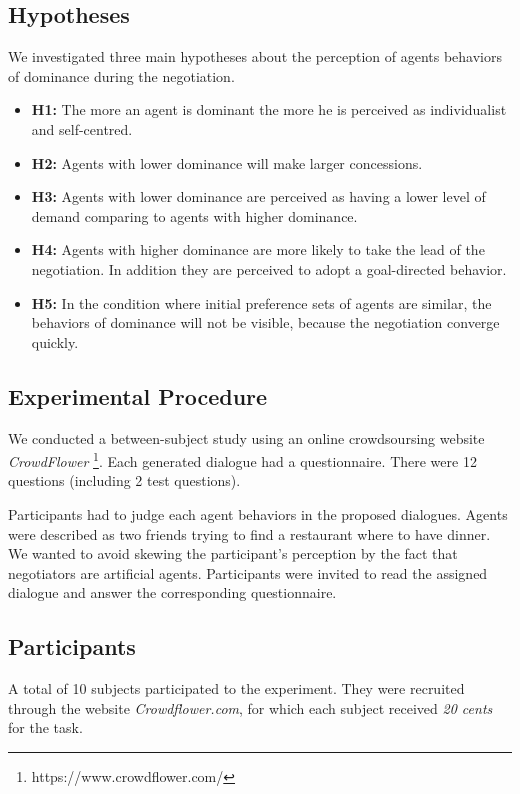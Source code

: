 \documentclass{llncs}
\begin{document}
	\subsection{Hypotheses}
	 We investigated three main hypotheses about the perception of agents behaviors of dominance during the negotiation. 
	 \begin{itemize}
	 	\item  \textbf{H1:} The more an agent is dominant the more he is perceived as individualist and self-centred.  
	 	
	 	\item \textbf{H2:} Agents with lower dominance will make larger concessions.
	 	
	 	\item \textbf{H3:} Agents with lower dominance are perceived as having a lower level of demand comparing to agents with higher dominance. 
	 	
	 	\item \textbf{H4:} Agents with higher dominance are more likely to take the lead of the negotiation. In addition they are perceived to adopt a goal-directed behavior. 
	 	
	 	\item \textbf{H5:} In the condition where initial preference sets of agents are similar, the behaviors of dominance will not be visible, because the negotiation converge quickly.
	 	
	 \end{itemize}
			
	\subsection{Experimental Procedure}
	
	We conducted a between-subject study using an online crowdsoursing website \emph{CrowdFlower} \footnote{https://www.crowdflower.com/}. 
	Each generated dialogue had a questionnaire. There were 12 questions (including 2 test questions).
	
	Participants had to judge each agent behaviors in the proposed dialogues. Agents were described as two friends trying to find a restaurant where to have dinner. We wanted to avoid skewing the participant's perception by the fact that negotiators are artificial agents. Participants were invited to read the assigned dialogue and answer the corresponding questionnaire. 
	
	\subsection{Participants}
	A total of 10 subjects participated to the experiment. They were recruited through the website \emph{Crowdflower.com}, for which each subject received \textit{20 cents} for the task. 
	
\end{document}
